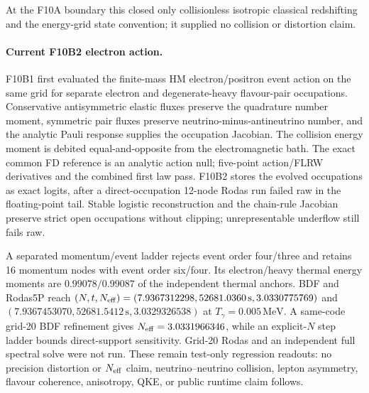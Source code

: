 At the F10A boundary this closed only collisionless isotropic classical
redshifting and the energy-grid state convention; it supplied no collision or
distortion claim.

\paragraph{Current F10B2 electron action.} F10B1 first evaluated the
finite-mass HM electron/positron event action on the same grid for separate
electron and degenerate-heavy flavour-pair occupations.  Conservative
antisymmetric elastic fluxes preserve the quadrature number moment, symmetric
pair fluxes preserve neutrino-minus-antineutrino number, and the analytic
Pauli response supplies the occupation Jacobian.  The collision energy moment
is debited equal-and-opposite from the electromagnetic bath.  The exact common
FD reference is an analytic action null; five-point action/FLRW derivatives and
the combined first law pass.  F10B2 stores the evolved occupations as exact
logits, after a direct-occupation 12-node Rodas run failed raw in the
floating-point tail.  Stable logistic reconstruction and the chain-rule
Jacobian preserve strict open occupations without clipping; unrepresentable
underflow still fails raw.

A separated momentum/event ladder rejects event order four/three and retains
16 momentum nodes with event order six/four.  Its electron/heavy thermal energy
moments are $0.99078/0.99087$ of the independent thermal anchors.  BDF and
Rodas5P reach
$(N,t,N_{\rm eff})=(7.9367312298,52681.0360\,\mathrm{s},3.0330775769)$ and
$(7.9367453070,52681.5412\,\mathrm{s},3.0329326538)$ at
$T_\gamma=0.005\,\mathrm{MeV}$.  A same-code grid-20 BDF refinement gives
$N_{\rm eff}=3.0331966346$, while an explicit-$N$ step ladder bounds direct-support
sensitivity.  Grid-20 Rodas and an independent full spectral solve were not
run.  These remain test-only regression readouts: no precision distortion or
$N_{\rm eff}$ claim, neutrino--neutrino collision, lepton asymmetry, flavour
coherence, anisotropy, QKE, or public runtime claim follows.

